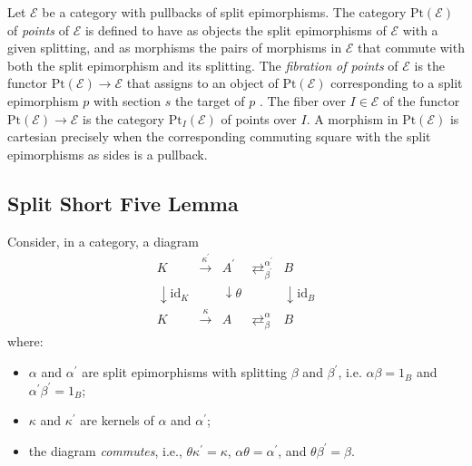 \documentclass[12pt]{amsart}
\theoremstyle{definition}
\begin{document}
Let $\mathcal{E}$ be a category with pullbacks of split epimorphisms. The
category $\mathrm{Pt}\left( \mathcal{E}\right) $ of \emph{points} of $%
\mathcal{E}$ is defined to have as objects the split epimorphisms of $%
\mathcal{E}$ with a given splitting, and as morphisms the pairs of morphisms
in $\mathcal{E}$ that commute with both the split epimorphism and its
splitting. The \emph{fibration of points} of $\mathcal{E}$ is the functor $%
\mathrm{Pt}\left( \mathcal{E}\right) \rightarrow \mathcal{E}$ that assigns
to an object of $\mathrm{Pt}\left( \mathcal{E}\right) $ corresponding to a
split epimorphism $p$ with section $s$ the target of $p$ \cite[Theorem 2.1.15%
]{borceux_malcev_2004}. The fiber over $I\in \mathcal{E}$ of the functor $%
\mathrm{Pt}\left( \mathcal{E}\right) \rightarrow \mathcal{E}$ is the
category $\mathrm{Pt}_{I}\left( \mathcal{E}\right) $ of points over $I$. A
morphism in $\mathrm{Pt}\left( \mathcal{E}\right) $ is cartesian precisely
when the corresponding commuting square with the split epimorphisms as sides
is a pullback.

\subsection{Split Short Five Lemma}

Consider, in a category, a diagram%
\begin{equation*}
\begin{array}{lllll}
K & \overset{\kappa ^{\prime }}{\rightarrow } & A^{\prime } & 
\rightleftarrows _{\beta ^{\prime }}^{\alpha ^{\prime }} & B \\ 
\downarrow \mathrm{id}_{K} &  & \downarrow \theta &  & \downarrow \mathrm{id}%
_{B} \\ 
K & \overset{\kappa }{\rightarrow } & A & \rightleftarrows _{\beta }^{\alpha
} & B%
\end{array}%
\end{equation*}%
where:

\begin{itemize}
\item $\alpha $ and $\alpha ^{\prime }$ are split epimorphisms with
splitting $\beta $ and $\beta ^{\prime }$, i.e. $\alpha \beta =1_{B}$ and $%
\alpha ^{\prime }\beta ^{\prime }=1_{B}$;

\item $\kappa $ and $\kappa ^{\prime }$ are kernels of $\alpha $ and $\alpha
^{\prime }$;

\item the diagram \emph{commutes}, i.e., $\theta \kappa ^{\prime }=\kappa $, 
$\alpha \theta =\alpha ^{\prime }$, and $\theta \beta ^{\prime }=\beta $.
\end{itemize}
\end{document}
